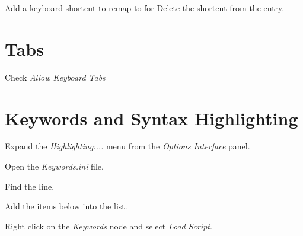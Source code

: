 \documentclass{lebook}
\begin{document}
Add a keyboard shortcut to remap  to  for 
Delete the  shortcut from the  entry.

	\section{Tabs}
    \begin{numberedlist}
    	\item {}
    	\item Check \textit{Allow Keyboard Tabs}
    \end{numberedlist}


	\section{Keywords and Syntax Highlighting}
	\begin{numberedlist}
		\item Expand the \textit{Highlighting:...} menu from the \textit{Options Interface} panel.
        \item Open the \textit{Keywords.ini} file.
        \item Find the  line.
        \item Add the items below into the list.
        \item Right click on the \textit{Keywords} node and select \textit{Load Script}.
	\end{numberedlist}
	\begin{plainlist}
        \item {}
        \item {}
        \item {}
        \item {}
        \item {}
        \item {}
	\end{plainlist}

	
\end{document}

